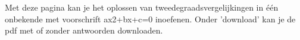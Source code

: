 \documentclass{ximera}
\begin{document}
	\author{Wiskunde Op Maat}

Met deze pagina kan je het oplossen van tweedegraadsvergelijkingen in één onbekende met voorschrift ax2+bx+c=0 inoefenen. 
Onder 'download' kan je de pdf met of zonder antwoorden downloaden.

\newcommand{\choicetwee}{{\wordChoice{\choice[correct]{twee}\choice{één}\choice{geen}}}}
\newcommand{\choiceeen}{{\wordChoice{\choice{twee}\choice[correct]{één}\choice{geen}}}}
\newcommand{\choicegeen}{{\wordChoice{\choice{twee}\choice]{één}\choice[correct]{geen}}}}

\newcommand{\choicepositief}{{\wordChoice{\choice[correct]{positief}\choice{nul}\choice{negatief}}}}
\newcommand{\choicenul}{{\wordChoice{\choice{positief}\choice[correct]{nul}\choice{negatief}}}}
\newcommand{\choicenegatief}{{\wordChoice{\choice{positief}\choice{nul}\choice[correct]{negatief}}}}
 
\end{document}
